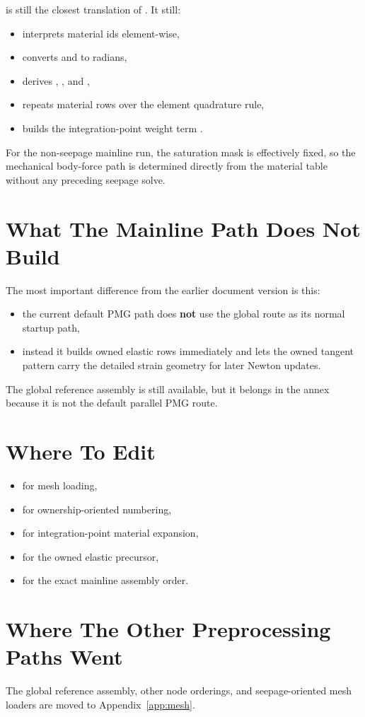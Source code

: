  is still the closest
translation of . It still:
\begin{itemize}
\item interprets material ids element-wise,
\item converts  and  to radians,
\item derives , , and ,
\item repeats material rows over the element quadrature rule,
\item builds the integration-point weight term .
\end{itemize}

For the non-seepage mainline run, the saturation mask is effectively fixed, so
the mechanical body-force path is determined directly from the material table
without any preceding seepage solve.

\section{What The Mainline Path Does Not Build}

The most important difference from the earlier document version is this:
\begin{itemize}
\item the current default PMG path does \textbf{not} use the global
route as its normal startup path,
\item instead it builds owned elastic rows immediately and lets the owned
tangent pattern carry the detailed strain geometry for later Newton updates.
\end{itemize}

The global reference assembly is still available, but it belongs in the annex
because it is not the default parallel PMG route.

\section{Where To Edit}

\begin{itemize}
\item {} for mesh loading,
\item {} for ownership-oriented numbering,
\item {} for integration-point material expansion,
\item {} for the owned elastic precursor,
\item {} for the exact mainline
assembly order.
\end{itemize}

\section{Where The Other Preprocessing Paths Went}

The global reference assembly, other node orderings, and seepage-oriented mesh
loaders are moved to Appendix~\ref{app:mesh}.
